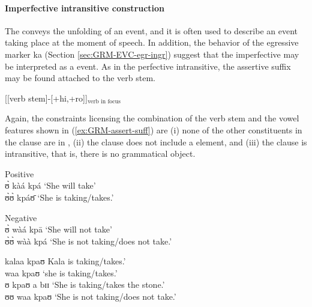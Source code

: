 \begin{exe}
\begin{exe}
\begin{exe}
\begin{exe}
\begin{exe}
\begin{exe}
\begin{exe}
\begin{exe}
\begin{exe}
\begin{exe}
\begin{exe}
\paragraph{Imperfective intransitive construction}
\label{sec:GRM-verb-imperf-intran}

The   conveys the unfolding of an event, and it is often used to describe an event taking place at the moment of speech. In addition, the behavior of the egressive marker {\sls ka} (Section \ref{sec:GRM-EVC-egr-ingr}) suggest that the imperfective may be interpreted as a  event. As in the perfective intransitive, the assertive suffix may be found attached to the verb stem. 

\ea\label{ex:GRM-assert-suff}
{\rm [[{verb stem}]-[{\sc +hi,+ro}]]$_\textrm{verb in focus}$}
\z

Again, the constraints licensing the combination of the verb stem and the vowel features  shown in (\ref{ex:GRM-assert-suff})   are (i) none of the other constituents in the clause are in , (ii) the clause does not include a  element, and (iii) the clause is intransitive, that is, there is no grammatical object. 





\ea\label{ex:GRM-pos-neg-take}
\ea\label{ex:GRM-ipfv-out-pos}{\rm Positive}\\
 ʊ̀ kàá kpá  {\rm `She will take'}\\
   ʊ̀ʊ̀ kpáʊ̄ {\rm `She  is taking/takes.'}

\ex\label{ex:GRM-ipfv-out-neg}{\rm Negative}\\
 ʊ̀ wàá kpā  {\rm  `She will not take'}\\
   ʊ̀ʊ̀   wàà   kpá {\rm `She  is not taking/does not take.'}

   
   \ex\label{ex:GRM-ipfv-out-nfoc}
 \textasteriskcentered kalaa kpaʊ {\rm Kala is taking/takes.'}\\
   \ex\label{ex:GRM-ipfv-out-stpro}
 \textasteriskcentered waa kpaʊ {\rm `{\sc she} is taking/takes.'}\\
    \ex\label{ex:GRM-ipfv-out-obj}
  \textasteriskcentered ʊ kpaʊ a bɪɪ  {\rm `She  is taking/takes the 
stone.'}\\
 \ex\label{ex:GRM-ipfv-out-neg1}
   \textasteriskcentered   ʊʊ   waa   kpaʊ {\rm `She  is not taking/does 
not take.'}


\end{exe}
\end{exe}
\end{exe}
\end{exe}
\end{exe}
\end{exe}
\end{exe}
\end{exe}
\end{exe}
\end{exe}
\end{exe}
